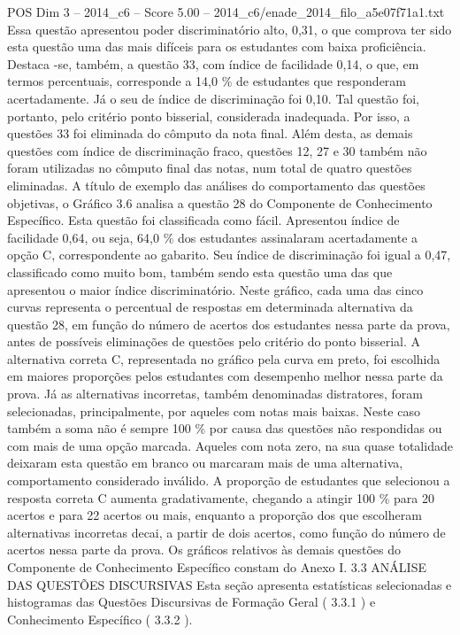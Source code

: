 \begin{textsample}{POS Dim 3 – 2014\_c6 – Score 5.00 – 2014\_c6/enade\_2014\_filo\_a5e07f71a1.txt}
Essa questão apresentou poder discriminatório alto, 0,31, o que comprova ter sido esta questão uma das mais difíceis para os estudantes com baixa proficiência.
Destaca -se, também, a questão 33, com índice de facilidade 0,14, o que, em termos percentuais, corresponde a 14,0 \% de estudantes que responderam acertadamente.
Já o seu de índice de discriminação foi 0,10.
Tal questão foi, portanto, pelo critério ponto bisserial, considerada inadequada.
Por isso, a questões 33 foi eliminada do cômputo da nota final.
Além desta, as demais questões com índice de discriminação fraco, questões 12, 27 e 30 também não foram utilizadas no cômputo final das notas, num total de quatro questões eliminadas.
A título de exemplo das análises do comportamento das questões objetivas, o Gráfico 3.6 analisa a questão 28 do Componente de Conhecimento Específico.
Esta questão foi classificada como fácil.
Apresentou índice de facilidade 0,64, ou seja, 64,0 \% dos estudantes assinalaram acertadamente a opção C, correspondente ao gabarito.
Seu índice de discriminação foi igual a 0,47, classificado como muito bom, também sendo esta questão uma das que apresentou o maior índice discriminatório.
Neste gráfico, cada uma das cinco curvas representa o percentual de respostas em determinada alternativa da questão 28, em função do número de acertos dos estudantes nessa parte da prova, antes de possíveis eliminações de questões pelo critério do ponto bisserial.
A alternativa correta C, representada no gráfico pela curva em preto, foi escolhida em maiores proporções pelos estudantes com desempenho melhor nessa parte da prova.
Já as alternativas incorretas, também denominadas distratores, foram selecionadas, principalmente, por aqueles com notas mais baixas.
Neste caso também a soma não é sempre 100 \% por causa das questões não respondidas ou com mais de uma opção marcada.
Aqueles com nota zero, na sua quase totalidade deixaram esta questão em branco ou marcaram mais de uma alternativa, comportamento considerado inválido.
A proporção de estudantes que selecionou a resposta correta C aumenta gradativamente, chegando a atingir 100 \% para 20 acertos e para 22 acertos ou mais, enquanto a proporção dos que escolheram alternativas incorretas decai, a partir de dois acertos, como função do número de acertos nessa parte da prova.
Os gráficos relativos às demais questões do Componente de Conhecimento Específico constam do Anexo I. 3.3 ANÁLISE DAS QUESTÕES DISCURSIVAS Esta seção apresenta estatísticas selecionadas e histogramas das Questões Discursivas de Formação Geral ( 3.3.1 ) e Conhecimento Específico ( 3.3.2 ).

\end{textsample}
